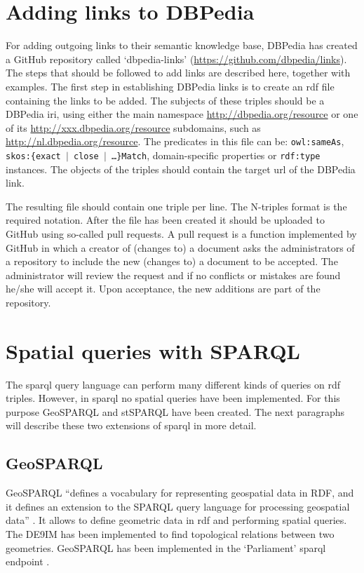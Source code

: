 \section{Adding links to DBPedia}
\label{par:dbpedia}

\begin{sloppypar}
	For adding outgoing links to their semantic knowledge base, DBPedia has created a GitHub repository called `dbpedia-links' (\url{https://github.com/dbpedia/links}). The steps that should be followed to add links are described here, together with examples. The first step in establishing DBPedia links is to create an \ac{rdf} file containing the links to be added. The subjects of these triples should be a DBPedia \ac{iri}, using either the main namespace \url{http://dbpedia.org/resource} or one of its \url{ http://xxx.dbpedia.org/resource} subdomains, such as \url{http://nl.dbpedia.org/resource}. The predicates in this file can be: \texttt{owl:sameAs}, \texttt{skos:\{exact $\vert$ close $\vert$ \ldots \}Match}, domain-specific properties or \texttt{rdf:type} instances. The objects of the triples should contain the target \ac{url} of the DBPedia link. 
\end{sloppypar}

The resulting file should contain one triple per line. The N-triples format is the required notation. After the file has been created it should be uploaded to GitHub using so-called pull requests. A pull request is a function implemented by GitHub in which a creator of (changes to) a document asks the administrators of a repository to include the new (changes to) a document to be accepted. The administrator will review the request and if no conflicts or mistakes are found he/she will accept it. Upon acceptance, the new additions are part of the repository.   

\section{Spatial queries with SPARQL}
\label{par:SpatialFilters}

The \ac{sparql} query language can perform many different kinds of queries on \ac{rdf} triples. However, in \ac{sparql} no spatial queries have been implemented. For this purpose GeoSPARQL and stSPARQL have been created. The next paragraphs will describe these two extensions of \ac{sparql} in more detail.

\subsection{GeoSPARQL}
GeoSPARQL \enquote{defines a vocabulary for representing geospatial data in RDF, and it defines an extension to the SPARQL query language for processing geospatial data} \cite[p. xvi]{LD:OGC}. It allows to define geometric data in \ac{rdf} and performing spatial queries. The \ac{DE9IM} \citep{GIS:9IM} has been implemented to find topological relations between two geometries. GeoSPARQL has been implemented in the `Parliament' \ac{sparql} endpoint \citep{LD:GeoSPARQL}. 

